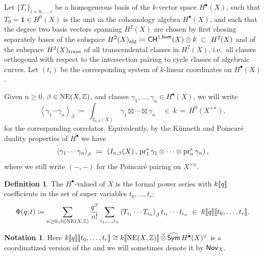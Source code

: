 \documentclass[twoside,leqno]{article}
\numberwithin{equation}{section}
\theoremstyle{plain}
\theoremstyle{definition}
\newtheorem{definition}[equation]{Definition}
\newtheorem{notation}[equation]{Notation}
\begin{document}
\medskip

Let $\{T_i\}_{i=0,\dots, r}$ be a homogeneous basis of the $k$-vector space $H^{\bullet}(X)$, such that  $T_0=\mathbf{1} \in H^0(X)$ is the unit in the cohomology algebra $H^{\bullet}(X)$, and such that the degree two basis vectors spanning $H^2(X)$ are chosen by first chosing separately bases of the subspace $H^2(X)_{\operatorname{alg}} \coloneqq \mathsf{CH}^{1,\mathsf{hom}}(X) \otimes k \ \subset \ H^2(X)$ and of the subspace $H^2(X)_{\operatorname{trans}}$ of all transcendental classes in $H^2(X)$, i.e.\ all  classes orthogonal with respect to the intersection pairing to cycle classes of algebraic curves.  Let $(t_{i})$ be the corresponding system of $k$-linear coordinates on $H^{\bullet}(X)$. 

\medskip
Given $n \geq 0$, $\beta \in \operatorname{NE}(X,\mathbb Z)$, and classes $\gamma_{1}, \ldots, \gamma_{n} \in H^{\bullet}(X)$, we will write
\[
\left\langle \gamma_{1} \cdots \gamma_{n} \right\rangle_{\beta} \ \coloneqq 
\ \int_{I_{n,\beta}(X)} \, \gamma_{1}\boxtimes \cdots \boxtimes \gamma_{n} \quad \in \ k \, = \,  H^0(X^{\times n}),
\]
for the corresponding correlator. Equivalently, by the K\"{u}nneth and Poincar\'{e} duality properties of $H^{\bullet}$ we have  
\[
\left\langle \gamma_{1} \cdots \gamma_{n} \right\rangle_{\beta} 
\ \coloneqq  
\ \left( I_{n,\beta}(X) \, , \, 
\operatorname{pr}_{1}^{*}\gamma_{1}\otimes \cdots  \otimes \operatorname{pr}_{n}^{*}\gamma_{n} \right),
\]
where we still write $(-,-)$ for the Poincar\'{e} pairing on 
$X^{\times n}$.

\begin{definition} \label{defi-GWPhi}
The $H^{\bullet}$-valued  of $X$ is the formal power series with $k[\![q]\!]$ coefficients in the set of super variables $t_{0}, \ldots, t_{r}$:
\begin{equation} \label{eq:GW_potential}
  \Phi(q;t)  \coloneqq \sum_{n\ge 0,\beta  \in \NE(X,\bbZ)} \frac{q^\beta}{n!} \sum_{i_1,\dots,i_n} \braket{T_{i_1}\cdots T_{i_n}}_\beta t_{i_1}\cdots t_{i_n} \ \in \ k\dbb{q}\dbb{t_{0},\ldots,t_{r}}.
\end{equation}
\end{definition}

\begin{notation} \label{not:novikovX} Here 
$k[\![q]\!][\![t_{0},\ldots,t_{r}]\!] \cong k[\![\operatorname{NE}(X,\mathbb Z)]\!]\, \widehat{\otimes}\, \widehat{\mathsf{Sym}}\, H^{\bullet}(X)^{\vee}$ is a coordinatized version of the  and we will sometimes denote it by $\mathsf{Nov}_{X}$.
\end{notation}
\end{document}
